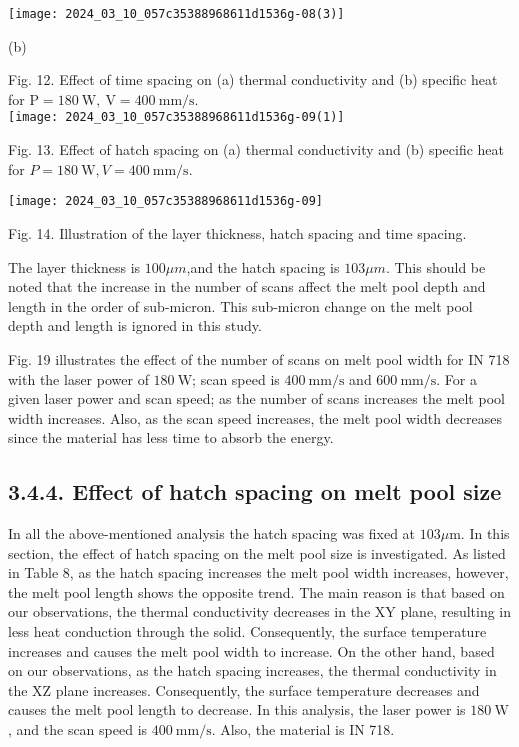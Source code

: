 \documentclass[10pt]{article}
\begin{document}
\begin{center}
\texttt{[image: 2024\_03\_10\_057c35388968611d1536g-08(3)]}
\end{center}

(b)

Fig. 12. Effect of time spacing on (a) thermal conductivity and (b) specific heat for $\mathrm{P}=180 \mathrm{~W}, \mathrm{~V}=400 \mathrm{~mm} / \mathrm{s}$.\\
\texttt{[image: 2024\_03\_10\_057c35388968611d1536g-09(1)]}

Fig. 13. Effect of hatch spacing on (a) thermal conductivity and (b) specific heat for $P=180 \mathrm{~W}, V=400 \mathrm{~mm} / \mathrm{s}$.

\begin{center}
\texttt{[image: 2024\_03\_10\_057c35388968611d1536g-09]}
\end{center}

Fig. 14. Illustration of the layer thickness, hatch spacing and time spacing.

The layer thickness is $100 \mu m$,and the hatch spacing is $103 \mu m$. This should be noted that the increase in the number of scans affect the melt pool depth and length in the order of sub-micron. This sub-micron change on the melt pool depth and length is ignored in this study.

Fig. 19 illustrates the effect of the number of scans on melt pool width for IN 718 with the laser power of $180 \mathrm{~W}$; scan speed is $400 \mathrm{~mm} / \mathrm{s}$ and $600 \mathrm{~mm} / \mathrm{s}$. For a given laser power and scan speed; as the number of scans increases the melt pool width increases. Also, as the scan speed increases, the melt pool width decreases since the material has less time to absorb the energy.

\subsection*{3.4.4. Effect of hatch spacing on melt pool size}
In all the above-mentioned analysis the hatch spacing was fixed at $103 \mu \mathrm{m}$. In this section, the effect of hatch spacing on the melt pool size is investigated. As listed in Table 8, as the hatch spacing increases the melt pool width increases, however, the melt pool length shows the opposite trend. The main reason is that based on our observations, the thermal conductivity decreases in the XY plane, resulting in less heat conduction through the solid. Consequently, the surface temperature increases and causes the melt pool width to increase. On the other hand, based on our observations, as the hatch spacing increases, the thermal conductivity in the XZ plane increases. Consequently, the surface temperature decreases and causes the melt pool length to decrease. In this analysis, the laser power is $180 \mathrm{~W}$, and the scan speed is $400 \mathrm{~mm} / \mathrm{s}$. Also, the material is IN 718.
\end{document}
